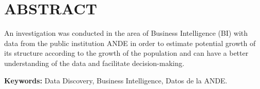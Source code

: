 \chapter*{\centering ABSTRACT}
	An investigation was conducted in the area of Business Intelligence (BI) with data from the public institution ANDE in order to estimate potential growth of its structure according to the growth of the population and can have a better understanding of the data and facilitate decision-making.


\vspace*{1\baselineskip}
\textbf{Keywords:} Data Discovery, Business Intelligence, Datos de la ANDE.